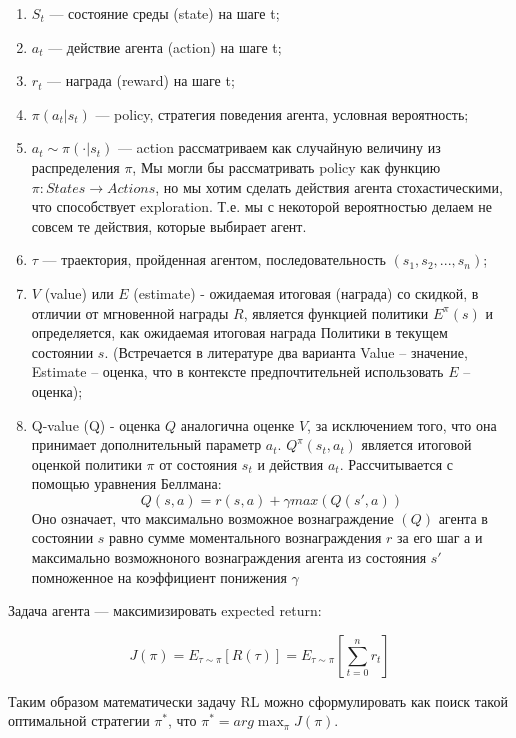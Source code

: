 \documentclass[bachelor, och, coursework]{shiza}
\begin{document}
\begin{enumerate}
    \item $S_t$ — состояние среды (state) на шаге t;
    \item $a_t$ — действие агента (action) на шаге t;
    \item $r_t$ — награда (reward) на шаге t;
    \item $\pi(a_t|s_t)$ — policy, стратегия поведения агента, условная вероятность;
    \item $a_t\sim\pi(\cdot|s_t)$ — action рассматриваем как случайную величину из распределения $\pi$,
    Мы могли бы рассматривать policy как функцию $\pi:States\to Actions$, но мы хотим сделать действия агента стохастическими, что способствует exploration.
    Т.е. мы с некоторой вероятностью делаем не совсем те действия, которые выбирает агент.
    \item $\tau$ — траектория, пройденная агентом, последовательность $(s_1, s_2, ..., s_n) $;
    \item $V$ (value) или $E$ (estimate) - ожидаемая итоговая (награда) со скидкой, в отличии от мгновенной награды $R$, является функцией политики $E^\pi(s)$ и
    определяется, как ожидаемая итоговая награда Политики в текущем состоянии $s$. (Встречается в литературе два варианта Value – значение, Estimate – оценка,
    что в контексте предпочтительней использовать $E$ – оценка);
    \item Q-value (Q) - оценка $Q$ аналогична оценке $V$, за исключением того, что она принимает дополнительный параметр $a_t$. $Q^\pi(s_t, a_t)$ является итоговой
    оценкой политики $\pi$ от состояния $s_t$ и действия $a_t$. Рассчитывается с помощью уравнения Беллмана:
    \begin{equation}
        Q(s, a) = r(s, a) + \gamma max(Q(s', a))
    \end{equation}
    Оно означает, что максимально возможное вознаграждение $(Q)$ агента в состоянии $s$ равно сумме моментального вознаграждения $r$ за его шаг $а$ и максимально возможноного вознаграждения агента
из состояния $s'$ помноженное на коэффициент понижения $\gamma$
\end{enumerate}

Задача агента — максимизировать expected return:

\begin{equation}
    J(\pi)=E_{\tau\sim\pi}[R(\tau)]=E_{\tau\sim\pi} \left[\sum_{t=0}^n r_t\right]
\end{equation}

Таким образом математически задачу RL можно сформулировать как поиск такой оптимальной стратегии $\pi^*$, что $\pi^* = arg \mathop {max} _ \pi J(\pi)$.
\end{document}
